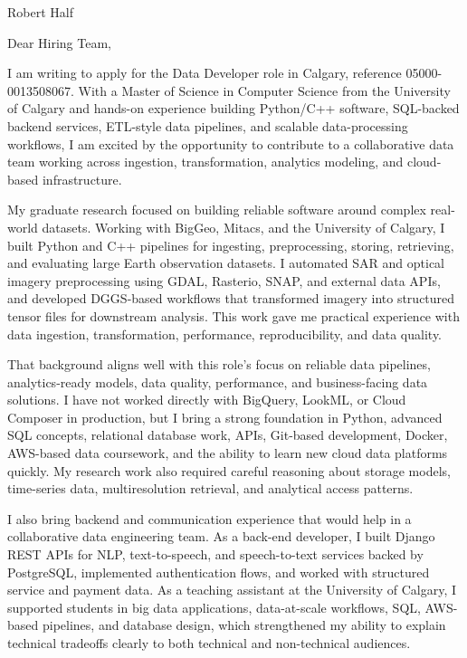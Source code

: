 \documentclass[11pt]{letter}
\begin{document}
\begin{letter}{Robert Half}

\opening{Dear Hiring Team,}

I am writing to apply for the Data Developer role in Calgary, reference 05000-0013508067. With a Master of Science in Computer Science from the University of Calgary and hands-on experience building Python/C++ software, SQL-backed backend services, ETL-style data pipelines, and scalable data-processing workflows, I am excited by the opportunity to contribute to a collaborative data team working across ingestion, transformation, analytics modeling, and cloud-based infrastructure.

My graduate research focused on building reliable software around complex real-world datasets. Working with BigGeo, Mitacs, and the University of Calgary, I built Python and C++ pipelines for ingesting, preprocessing, storing, retrieving, and evaluating large Earth observation datasets. I automated SAR and optical imagery preprocessing using GDAL, Rasterio, SNAP, and external data APIs, and developed DGGS-based workflows that transformed imagery into structured tensor files for downstream analysis. This work gave me practical experience with data ingestion, transformation, performance, reproducibility, and data quality.

That background aligns well with this role's focus on reliable data pipelines, analytics-ready models, data quality, performance, and business-facing data solutions. I have not worked directly with BigQuery, LookML, or Cloud Composer in production, but I bring a strong foundation in Python, advanced SQL concepts, relational database work, APIs, Git-based development, Docker, AWS-based data coursework, and the ability to learn new cloud data platforms quickly. My research work also required careful reasoning about storage models, time-series data, multiresolution retrieval, and analytical access patterns.

I also bring backend and communication experience that would help in a collaborative data engineering team. As a back-end developer, I built Django REST APIs for NLP, text-to-speech, and speech-to-text services backed by PostgreSQL, implemented authentication flows, and worked with structured service and payment data. As a teaching assistant at the University of Calgary, I supported students in big data applications, data-at-scale workflows, SQL, AWS-based pipelines, and database design, which strengthened my ability to explain technical tradeoffs clearly to both technical and non-technical audiences.


\end{letter}
\end{document}
